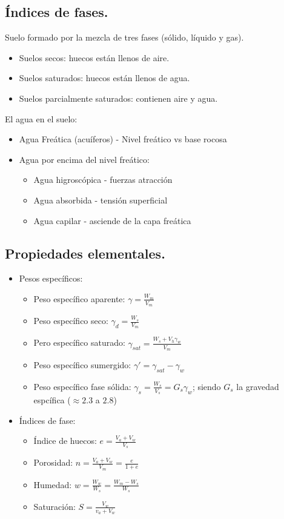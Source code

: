 \subsection{Índices de fases.}
Suelo formado por la mezcla de tres fases (sólido, líquido y gas).
\begin{itemize}
    \item Suelos secos: huecos están llenos de aire.
    \item Suelos saturados: huecos están llenos de agua.
    \item Suelos parcialmente saturados: contienen aire y agua.
\end{itemize}

El agua en el suelo:
\begin{itemize}
    \item Agua Freática (acuíferos) - Nivel freático vs base rocosa
    \item Agua por encima del nivel freático:
    \begin{itemize}
        \item Agua higroscópica - fuerzas atracción
        \item Agua absorbida - tensión superficial
        \item Agua capilar - asciende de la capa freática
    \end{itemize}
\end{itemize}

\subsection{Propiedades elementales.}
\begin{itemize}
    \item Pesos específicos:
    \begin{itemize}
        \item Peso específico aparente: $\gamma = \frac{W_m}{V_m}$
        \item Peso específico seco: $\gamma_d = \frac{W_s}{V_m}$
        \item Pero específico saturado: $\gamma_{sat} = \frac{W_s + V_h \gamma_w}{V_m}$
        \item Peso específico sumergido: $\gamma' = \gamma_{sat} - \gamma_w$
        \item Peso específico fase sólida: $\gamma_s =\frac{W_s}{V_s} = G_s \gamma_w$; siendo $G_s$ la gravedad espcífica ($\approx 2.3$ a $2.8$)
    \end{itemize}
    \item Índices de fase:
    \begin{itemize}
        \item Índice de huecos: $e = \frac{V_a + V_w}{V_s}$
        \item Porosidad: $n = \frac{V_a + V_w}{V_m} = \frac{e}{1 + e }$
        \item Humedad: $w = \frac{W_w}{W_s} = \frac{W_m - W_s}{W_s}$
        \item Saturación: $S = \frac{V_w}{v_a + V_w}$
    \end{itemize}
\end{itemize}

